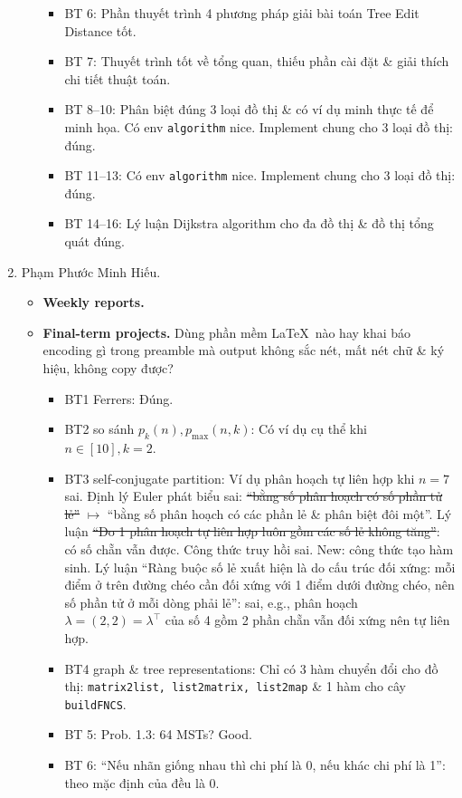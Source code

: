 \documentclass{article}
\begin{document}
\begin{enumerate}
\begin{itemize}
\begin{itemize}
            \item BT 6: Phần thuyết trình 4 phương pháp giải bài toán Tree Edit Distance tốt.
            \item BT 7: Thuyết trình tốt về tổng quan, thiếu phần cài đặt \& giải thích chi tiết thuật toán.
            \item BT 8--10: Phân biệt đúng 3 loại đồ thị \& có ví dụ minh thực tế để minh họa. Có env {\tt algorithm} nice. Implement chung cho 3 loại đồ thị: đúng.
            \item BT 11--13: Có env {\tt algorithm} nice. Implement chung cho 3 loại đồ thị: đúng.
            \item BT 14--16: Lý luận Dijkstra algorithm cho đa đồ thị \& đồ thị tổng quát đúng.
        \end{itemize}
    \end{itemize}
    \item {\sc Phạm Phước Minh Hiếu.}
    \begin{itemize}
        \item {\bf Weekly reports.}
        \item {\bf Final-term projects.} Dùng phần mềm \LaTeX\ nào hay khai báo encoding gì trong preamble mà output không sắc nét, mất nét chữ \& ký hiệu, không copy được?
        \begin{itemize}
            \item BT1 Ferrers: Đúng.
            \item BT2 so sánh $p_k(n),p_{\max}(n,k)$: Có ví dụ cụ thể khi $n\in[10],k = 2$.
            \item BT3 self-conjugate partition: Ví dụ phân hoạch tự liên hợp khi $n = 7$ sai. Định lý Euler phát biểu sai: \st{``bằng số phân hoạch có số phần tử lẻ''} $\mapsto$ ``bằng số phân hoạch có các phần lẻ \& phân biệt đôi một''. Lý luận \st{``Do 1 phân hoạch tự liên hợp luôn gồm các số lẻ không tăng''}: có số chẵn vẫn được. Công thức truy hồi sai. New: công thức tạo hàm sinh. Lý luận ``Ràng buộc số lẻ xuất hiện là do cấu trúc đối xứng: mỗi điểm ở trên đường chéo cần đối xứng với 1 điểm dưới đường chéo, nên số phần tử ở mỗi dòng phải lẻ'': sai, e.g., phân hoạch $\lambda = (2,2) = \lambda^\top$ của số 4 gồm 2 phần chẵn vẫn đối xứng nên tự liên hợp.
            \item BT4 graph \& tree representations: Chỉ có 3 hàm chuyển đổi cho đồ thị: {\tt matrix2list, list2matrix, list2map} \& 1 hàm cho cây {\tt buildFNCS}.
            \item BT 5: Prob. 1.3: 64 MSTs? Good.
            \item BT 6: ``Nếu nhãn giống nhau thì chi phí là 0, nếu khác chi phí là 1'': theo mặc định của \cite{Valiente2021} đều là 0.

\end{itemize}
\end{itemize}
\end{enumerate}
\end{document}
